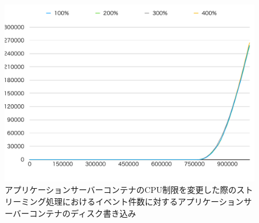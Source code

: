 \documentclass[../../../../../main]{subfiles}
\begin{document}
    \begin{figure}[H]
        \centering
        \includegraphics[width=12cm]{graph}
        \caption{アプリケーションサーバーコンテナのCPU制限を変更した際のストリーミング処理におけるイベント件数に対するアプリケーションサーバーコンテナのディスク書き込み}
        \label{fig:stream-change-app-cpu-limit-app-disk-in-app_1024-db_1_1024}
    \end{figure}
\end{document}
